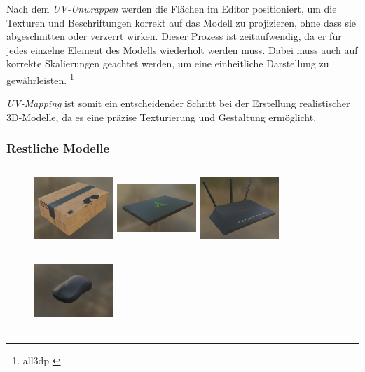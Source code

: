 Nach dem \textit{UV-Unwrappen} werden die Flächen im Editor positioniert, um die Texturen und Beschriftungen korrekt auf das Modell zu projizieren, ohne dass sie abgeschnitten oder verzerrt wirken. Dieser Prozess ist zeitaufwendig, da er für jedes einzelne Element des Modells wiederholt werden muss. Dabei muss auch auf korrekte Skalierungen geachtet werden, um eine einheitliche Darstellung zu gewährleisten. \footnote{all3dp \cite{Blender UV Mapping Simply Explained}}

\textit{UV-Mapping} ist somit ein entscheidender Schritt bei der Erstellung realistischer 3D-Modelle, da es eine präzise Texturierung und Gestaltung ermöglicht.

\subsubsection{\label{sec:restlicheModelle}Restliche Modelle}
\begin{figure}[H]
    \centering
    \begin{minipage}[b]{0.20\textwidth}
        \centering
        \includegraphics[width=3cm,height=3cm]{images/package.png}
    \end{minipage}
    \hfill
    \begin{minipage}[b]{0.20\textwidth}
        \centering
        \includegraphics[width=3cm,height=3cm]{images/laptop.png}
    \end{minipage}
    \hfill
    \begin{minipage}[b]{0.20\textwidth}
        \centering
        \includegraphics[width=3cm,height=3cm]{images/router.png}
    \end{minipage}
    \hfill
    \begin{minipage}[b]{0.20\textwidth}
        \centering
        \includegraphics[width=3cm,height=3cm]{images/mouse.png}
    \end{minipage}
\end{figure}

